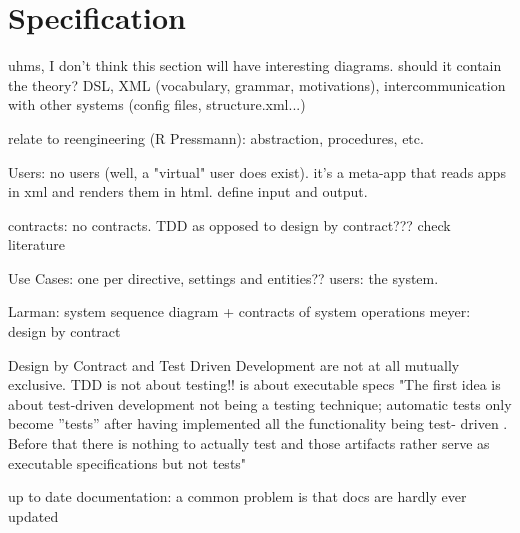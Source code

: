 \chapter{Specification}
uhms, I don't think this section will have interesting diagrams.
should it contain the theory? DSL, XML (vocabulary, grammar, motivations), intercommunication with other systems (config files, structure.xml...)

relate to reengineering (R Pressmann): abstraction, procedures, etc.

Users: no users (well, a "virtual" user does exist). it's a meta-app that reads apps in xml and renders them in html. define input and output.

contracts: no contracts. TDD as opposed to design by contract??? check literature

Use Cases: one per directive, settings and entities?? users: the system.


Larman: system sequence diagram + contracts of system operations
meyer: design by contract

Design by Contract and Test Driven Development are not at all mutually exclusive.
TDD is not about testing!! is about executable specs
"The first idea is about test-driven development not being a testing technique;
automatic tests only become ”tests” after having implemented all the functionality
being test-
driven
. Before that there is nothing to actually
test
and those artifacts
rather serve as executable
specifications
but not tests"

up to date documentation: a common problem is that docs are hardly ever updated
